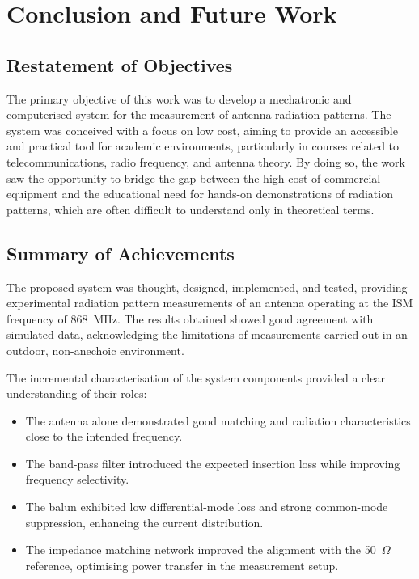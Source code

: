 \chapter{Conclusion and Future Work}
\label{cap:conclusao}

\section{Restatement of Objectives}

The primary objective of this work was to develop a mechatronic and computerised system for the measurement of antenna radiation patterns. The system was conceived with a focus on low cost, aiming to provide an accessible and practical tool for academic environments, particularly in courses related to telecommunications, radio frequency, and antenna theory. By doing so, the work saw the opportunity to bridge the gap between the high cost of commercial equipment and the educational need for hands-on demonstrations of radiation patterns, which are often difficult to understand only in theoretical terms.

\section{Summary of Achievements}

The proposed system was thought, designed, implemented, and tested, providing experimental radiation pattern measurements of an antenna operating at the ISM frequency of 868~MHz. The results obtained showed good agreement with simulated data, acknowledging the limitations of measurements carried out in an outdoor, non-anechoic environment.

The incremental characterisation of the system components provided a clear understanding of their roles:
\begin{itemize}
    \item The antenna alone demonstrated good matching and radiation characteristics close to the intended frequency.
    \item The band-pass filter introduced the expected insertion loss while improving frequency selectivity.
    \item The balun exhibited low differential-mode loss and strong common-mode suppression, enhancing the current distribution.
    \item The impedance matching network improved the alignment with the 50~$\Omega$ reference, optimising power transfer in the measurement setup.
\end{itemize}


